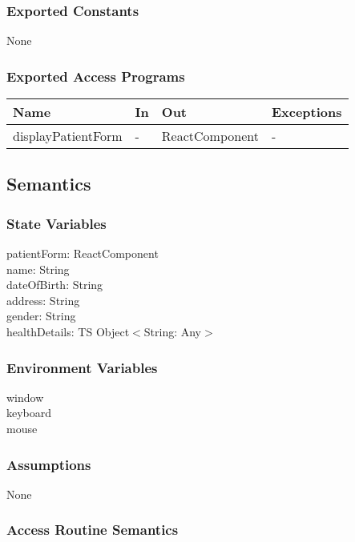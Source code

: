 \documentclass[12pt, titlepage]{article}
\begin{document}
\subsubsection{Exported Constants}
None

\subsubsection{Exported Access Programs}

\begin{center}
\begin{tabular}{p{4cm} p{4cm} p{4cm} p{4cm}}
\hline
\textbf{Name} & \textbf{In} & \textbf{Out} & \textbf{Exceptions} \\
\hline
displayPatientForm & - & ReactComponent & - \\
\hline
\end{tabular}
\end{center}

\subsection{Semantics}

\subsubsection{State Variables}

patientForm: ReactComponent \\
name: String \\
dateOfBirth: String \\
address: String \\
gender: String \\
healthDetails: TS Object$<$String: Any$>$

\subsubsection{Environment Variables}

window \\
keyboard \\
mouse

\subsubsection{Assumptions}

None

\subsubsection{Access Routine Semantics}
\end{document}
